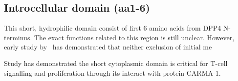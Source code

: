 \subsection{Introcellular domain (aa1-6)}

This short, hydrophilic domain consist of first 6 amino acids from DPP4 N-terminus. The exact functions related to this region is still unclear. However, early study by~\citet{Hong1990} has demonstrated that neither exclusion of initial me

Study has demonstrated the short cytoplasmic domain is critical for T-cell signalling and proliferation through its interact with protein CARMA-1. \cite{Ohnuma_2007}